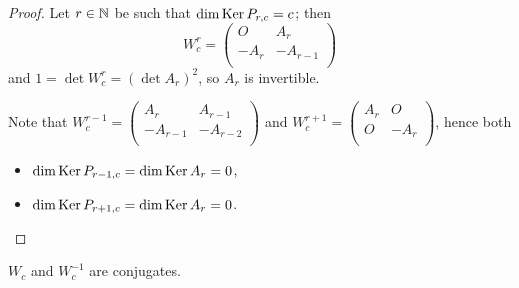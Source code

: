 \begin{proof}
  Let $r\in\mathbb{N}$ be such that $\dim\operatorname{Ker} P_{r,c} = c$; then
  \[
  W_{c}^{r}
  =
  \left(
  \begin{array}{cc}
     O    &  A_{r}  \\
    -A_{r} & -A_{r-1} \\
  \end{array}
  \right)
  \]
  and $1 = \det W_{c}^{r} = (\det A_{r})^{2}$, so $A_{r}$ is
  invertible.

  Note that
  $W_{c}^{r-1} = \left(\begin{smallmatrix} A_{r} & A_{r-1} \\-A_{r-1} & -A_{r-2} \\\end{smallmatrix}\right)$
  and
  $W_{c}^{r+1} = \left(\begin{smallmatrix} A_{r} & O \\ O & -A_{r} \\\end{smallmatrix}\right)$,
  hence both
  \begin{itemize}
    \item $\dim\operatorname{Ker} P_{r-1,c} = \dim\operatorname{Ker} A_{r} = 0$,
    \item $\dim\operatorname{Ker} P_{r+1,c} = \dim\operatorname{Ker} A_{r} = 0$.
  \end{itemize}
\end{proof}

\begin{lemma}
  $W_{c}$ and $W_{c}^{-1}$ are conjugates.
\end{lemma}

